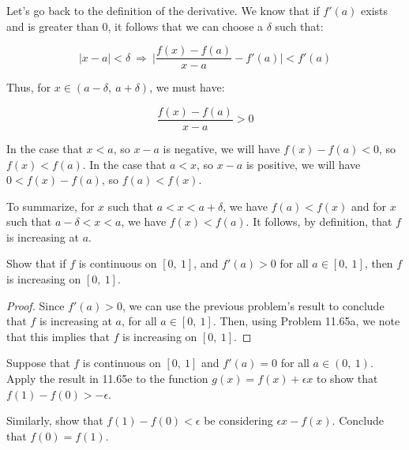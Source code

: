 \documentclass[10pt, oneside]{amsart}
\newenvironment{problem}[2][Problem]{\begin{trivlist}
\item[\hskip \labelsep {\bfseries #1}\hskip \labelsep {\bfseries #2.}]}{\end{trivlist}}
\begin{document}
    \begin{problem}{11.65d}
      Let's go back to the definition of the derivative. We know that if $f'(a)$ exists and is greater than $0$, it follows that we can choose a $\delta$ such that:

      $$|x - a| < \delta \ \Rightarrow \ \Big| \frac{f(x) - f(a)}{x - a} - f'(a) \Big| < f'(a)$$

      Thus, for $x \in (a - \delta, \ a + \delta)$, we must have:

      $$\frac{f(x) - f(a)}{x - a} > 0$$

      In the case that $x < a$, so $x - a$ is negative, we will have $f(x) - f(a) < 0$, so $f(x) < f(a)$. In the case that
      $a < x$, so $x - a$ is positive, we will have $0 < f(x) - f(a)$, so $f(a) < f(x)$.
      \newline

      To summarize, for $x$ such that $a < x < a + \delta$, we have $f(a) < f(x)$ and for $x$ such that $a - \delta < x < a$,
      we have $f(x) < f(a)$. It follows, by definition, that $f$ is increasing at $a$.
    \end{problem}

    \begin{problem}{11.65e}
      Show that if $f$ is continuous on $[0, \ 1]$, and $f'(a) > 0$ for all $a \in [0, \ 1]$, then $f$ is increasing
      on $[0, \ 1]$.
    \end{problem}

    \begin{proof}
      Since $f'(a) > 0$, we can use the previous problem's result to conclude that $f$ is increasing at $a$, for all $a \in [0, \ 1]$. Then,
      using Problem 11.65a, we note that this implies that $f$ is increasing on $[0, \ 1]$.
      \end{proof}

    \begin{problem}{11.65f}
      Suppose that $f$ is continuous on $[0, \ 1]$ and $f'(a) = 0$ for all $a \in (0, \ 1)$.
      Apply the result in 11.65e to the function $g(x) = f(x) + \epsilon x$ to show that $f(1) - f(0) > -\epsilon$.
      \newline

      Similarly, show that $f(1) - f(0) < \epsilon$ be considering $\epsilon x - f(x)$. Conclude that $f(0) = f(1)$.
    \end{problem}
\end{document}

